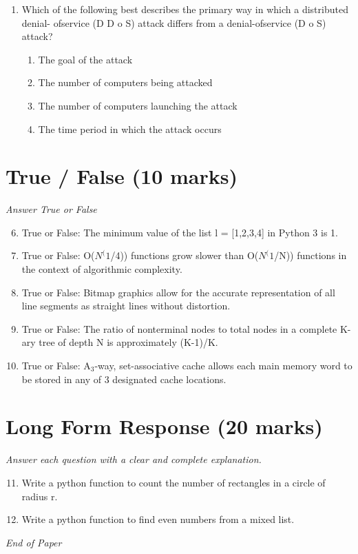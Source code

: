 \documentclass[12pt]{article}
\begin{document}
\begin{enumerate}[label=\arabic*.]
\begin{enumerate}[label=(\alph*)]
\end{enumerate}
\item Which of the following best describes the primary way in which a distributed denial- ofservice (D D o S) attack differs from a denial-ofservice (D o S) attack?
\begin{enumerate}[label=(\alph*)]
    \item The goal of the attack
    \item The number of computers being attacked
    \item The number of computers launching the attack
    \item The time period in which the attack occurs
\end{enumerate}
\end{enumerate}

\section*{True / False (10 marks)}
\textit{Answer True or False}
\begin{enumerate}[label=\arabic*.]
\setcounter{enumi}{5}
\item True or False: The minimum value of the list l = [1,2,3,4] in Python 3 is 1.
\item True or False: O($N^(1$/4)) functions grow slower than O($N^(1$/N)) functions in the context of algorithmic complexity.
\item True or False: Bitmap graphics allow for the accurate representation of all line segments as straight lines without distortion.
\item True or False: The ratio of nonterminal nodes to total nodes in a complete K-ary tree of depth N is approximately (K-1)/K.
\item True or False: A$_{3}$-way, set-associative cache allows each main memory word to be stored in any of 3 designated cache locations.
\end{enumerate}

\section*{Long Form Response (20 marks)}
\textit{Answer each question with a clear and complete explanation.}
\begin{enumerate}[label=\arabic*.]
\setcounter{enumi}{10}
\item Write a python function to count the number of rectangles in a circle of radius r.
\item Write a python function to find even numbers from a mixed list.
\end{enumerate}

\vfill
\noindent\textit{End of Paper}
\end{document}
